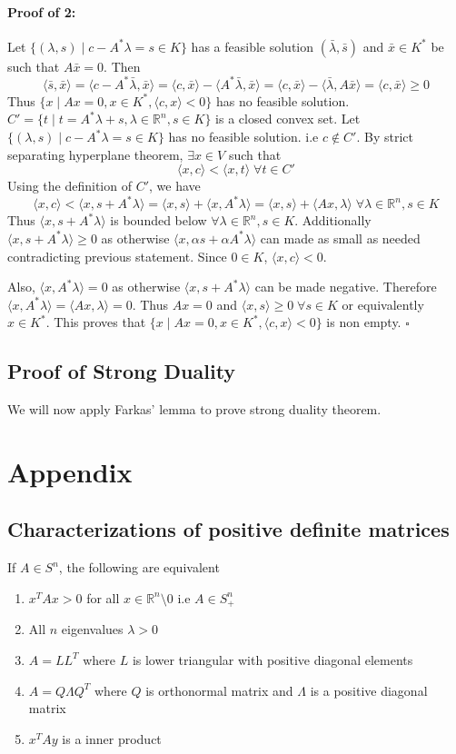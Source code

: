 \documentclass[a4paper,11pt]{article}
\newcommand{\Rn}{\mathbb{R}^n}
\newcommand\inrpd[2]{\langle #1, #2 \rangle}
\begin{document}
\paragraph{Proof of 2:}
Let  $\{(\lambda,s) \mid c - A^*\lambda  = s \in K \}$  has a  feasible solution $(\bar{\lambda},\bar{s})$ and  $\bar{x} \in K^*$ be such that $A\bar{x} = 0$. Then 
\[
\inrpd{\bar{s}}{\bar{x}} =  \inrpd{c - A^*\bar{\lambda} }{\bar{x}} = \inrpd{c}{\bar{x}} - \inrpd{ A^*\bar{\lambda} }{\bar{x}}
= \inrpd{c}{\bar{x}} - \inrpd{ \bar{\lambda} }{A\bar{x}} = \inrpd{c}{\bar{x}} \geq 0
\]
Thus $\{x \mid Ax = 0, x\in K^*, \inrpd{c}{x} < 0 \}$ has no feasible solution.
\\


$C' = \{t \mid t = A^*\lambda  + s, \lambda \in \Rn, s \in K \}$ is a closed convex set. Let $\{(\lambda,s) \mid c - A^*\lambda  = s \in K \}$  has no feasible solution. i.e $c \notin C'$.
By strict separating hyperplane theorem, $\exists x \in V$ such that 
\[ \inrpd{x}{c} < \inrpd{x}{t}\; \forall t \in C'\]
Using the definition of $C'$, we have 
\[ \inrpd{x}{c} < \inrpd{x}{s + A^*\lambda} = \inrpd{x}{s}  + \inrpd{x}{A^*\lambda}
 =  \inrpd{x}{s}  + \inrpd{Ax}{\lambda}
\; \forall \lambda \in \Rn,  s \in K
\]
Thus $\inrpd{x}{s + A^*\lambda}$ is bounded below $\forall \lambda \in \Rn, s \in K$. Additionally $\inrpd{x}{s + A^*\lambda} \geq 0$ as otherwise $\inrpd{x}{\alpha s + \alpha A^*\lambda}$ can made as small as needed contradicting previous statement. Since $0 \in K$, $\inrpd{x}{c} <0$. 


Also, $\inrpd{x}{A^*\lambda} = 0$ as otherwise $\inrpd{x}{ s + A^*\lambda}$ can be made negative.
Therefore $\inrpd{x}{A^*\lambda} = \inrpd{Ax}{\lambda} = 0$. Thus $Ax = 0$ and $\inrpd{x}{s} \geq 0 \; \forall s \in K$ or equivalently $x \in K^*$.
This proves that $\{x \mid Ax = 0, x\in K^*, \inrpd{c}{x} < 0 \}$ is non empty.
$\square$


\subsection{Proof of Strong Duality}
We will now apply Farkas' lemma to prove strong duality theorem.




\appendix
\section{Appendix}
\subsection{Characterizations of positive definite matrices}
If $A \in S^n$, the following are equivalent
\begin{enumerate}
\item $x^T A x > 0$ for all $x \in \Rn \setminus{0}$ i.e $A\in S^n_+$
\item All $n$ eigenvalues $\lambda > 0$
\item $A = LL^T$ where $L$ is lower triangular with positive diagonal elements
\item $A = Q\Lambda Q^T$ where $Q$ is orthonormal matrix and $\Lambda$ is a positive diagonal matrix
\item $x^T A y$ is a inner product
\end{enumerate}
\end{document}
